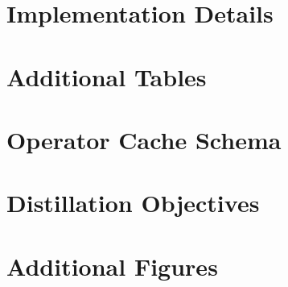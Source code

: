 \documentclass[11pt]{article}
\begin{document}
\appendix

\section{Implementation Details}


\section{Additional Tables}


\section{Operator Cache Schema}


\section{Distillation Objectives}


\section{Additional Figures}

\end{document}
